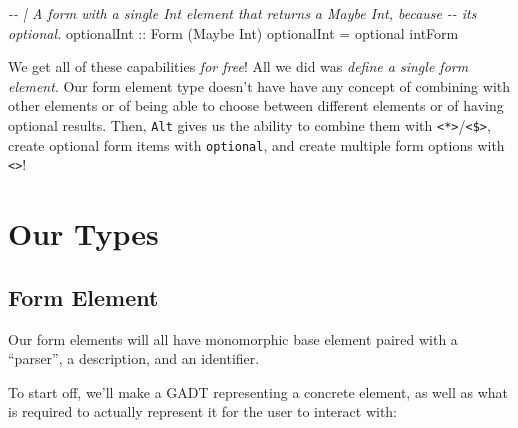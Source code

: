 \documentclass[]{article}
\newenvironment{Shaded}{}{}
\newcommand{\CommentTok}[1]{\textcolor[rgb]{0.38,0.63,0.69}{\textit{#1}}}
\newcommand{\DataTypeTok}[1]{\textcolor[rgb]{0.56,0.13,0.00}{#1}}
\newcommand{\NormalTok}[1]{#1}
\newcommand{\OtherTok}[1]{\textcolor[rgb]{0.00,0.44,0.13}{#1}}
\begin{document}
\begin{Shaded}
\begin{Highlighting}[]
\CommentTok{{-}{-} | A form with a single \textquotesingle{}Int\textquotesingle{} element that returns a \textquotesingle{}Maybe Int\textquotesingle{}, because}
\CommentTok{{-}{-} it\textquotesingle{}s optional.}
\OtherTok{optionalInt ::} \DataTypeTok{Form}\NormalTok{ (}\DataTypeTok{Maybe} \DataTypeTok{Int}\NormalTok{)}
\NormalTok{optionalInt }\OtherTok{=}\NormalTok{ optional intForm}
\end{Highlighting}
\end{Shaded}

We get all of these capabilities \emph{for free}! All we did was \emph{define a
single form element}. Our form element type doesn't have have any concept of
combining with other elements or of being able to choose between different
elements or of having optional results. Then, \texttt{Alt} gives us the ability
to combine them with
\texttt{\textless{}*\textgreater{}}/\texttt{\textless{}\$\textgreater{}}, create
optional form items with \texttt{optional}, and create multiple form options
with \texttt{\textless{}\textbar{}\textgreater{}}!

\section{Our Types}\label{our-types}

\subsection{Form Element}\label{form-element}

Our form elements will all have monomorphic base element paired with a
``parser'', a description, and an identifier.

To start off, we'll make a GADT representing a concrete element, as well as what
is required to actually represent it for the user to interact with:
\end{document}
